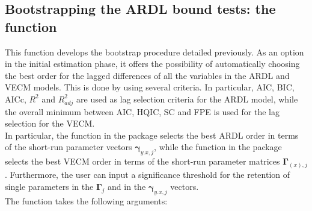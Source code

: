 \subsection{Bootstrapping the ARDL bound tests: the  function}
This function develops the bootstrap procedure detailed previously. As an option in the initial estimation phase, it offers the possibility of automatically choosing the best order for the lagged differences of all the variables in the ARDL and VECM models. This is done by using  several criteria. In particular, AIC, BIC, AICc, $R^2$ and $R^2_{adj}$ are used as lag selection criteria for the ARDL model, while the overall minimum between AIC, HQIC, SC and FPE is used for the lag selection for the VECM.\\
In particular, the  function in the package  \citep{PKGARDL} selects the best ARDL order in terms of the short-run parameter vectors $\boldsymbol\gamma_{y.x,j}$, while the  function in the package  \citep{PKGVARS} selects the best VECM order in terms of the short-run parameter matrices $\boldsymbol\Gamma_{(x),j}$. Furthermore, the user can input a significance threshold for the retention of single parameters in the $\boldsymbol\Gamma_j$ and in the $\boldsymbol\gamma_{y.x,j}$ vectors.\\
The function  takes the following arguments:
